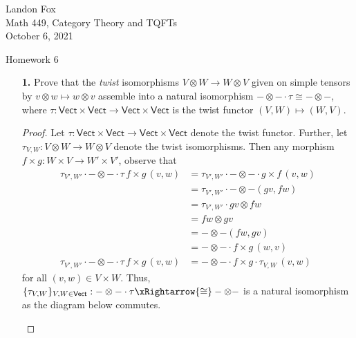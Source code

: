 \documentclass[ 12pt ]{article}
\begin{document}
\noindent Landon Fox \\
\noindent Math 449, Category Theory and TQFTs \\
\noindent October 6, 2021

\begin{center}
\Large Homework 6
\end{center}

\begin{enumerate}

	\item[\textbf{1.}] Prove that the \textit{twist} isomorphisms $V \otimes W \to W \otimes V$ given on simple tensors by $v \otimes w \mapsto w \otimes v$ assemble into a natural isomorphism $- \otimes - \cdot \tau \cong - \otimes -$, where $\tau : \mathsf{Vect} \times \mathsf{Vect} \to \mathsf{Vect} \times \mathsf{Vect}$ is the twist functor $(V, W) \mapsto (W, V)$.

		\begin{proof}
			Let $\tau : \mathsf{Vect} \times \mathsf{Vect} \to \mathsf{Vect} \times \mathsf{Vect}$ denote the twist functor. Further, let $\tau_{V, W} : V \otimes W \to W \otimes V$ denote the twist isomorphisms. Then any morphism $f \times g : W \times V \to W' \times V'$, observe that
			\begin{align*}
				\tau_{V', W'} \cdot - \otimes - \cdot \tau\, f \times g\, (v, w) &= \tau_{V', W'} \cdot - \otimes - \cdot g \times f\, (v, w) \\
				&= \tau_{V', W'} \cdot - \otimes - (gv, fw) \\
				&= \tau_{V', W'} \cdot gv \otimes fw \\
				&= fw \otimes gv \\
				&= - \otimes - (fw, gv) \\
				&= - \otimes - \cdot f \times g\, (w, v) \\
				\tau_{V', W'} \cdot - \otimes - \cdot \tau\, f \times g\, (v, w) &= - \otimes - \cdot f \times g \cdot \tau_{V, W}\, (v, w)
			\end{align*}
			for all $(v, w) \in V \times W$. Thus, $\{ \tau_{V, W} \}_{V, W \in \mathsf{Vect}} : - \otimes - \cdot \tau \xRightarrow{\cong} - \otimes -$ is a natural isomorphism as the diagram below commutes.
			\begin{center}
			\end{center}
		\end{proof}



\end{enumerate}
\end{document}
